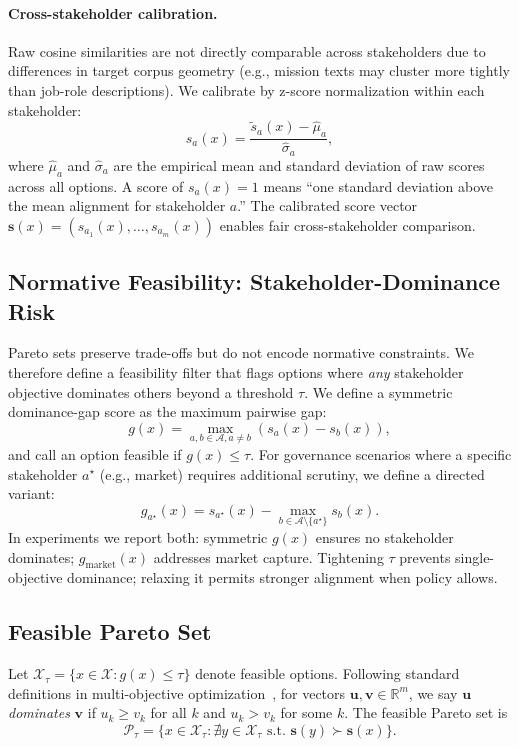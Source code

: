 \documentclass[sigconf,review]{acmart}
\begin{document}
\paragraph{Cross-stakeholder calibration.}
Raw cosine similarities are not directly comparable across stakeholders due to differences in target corpus geometry (e.g., mission texts may cluster more tightly than job-role descriptions). We calibrate by z-score normalization within each stakeholder:
\begin{equation}
  s_a(x) = \frac{\tilde{s}_a(x) - \hat{\mu}_a}{\hat{\sigma}_a},
\end{equation}
where $\hat{\mu}_a$ and $\hat{\sigma}_a$ are the empirical mean and standard deviation of raw scores across all options. A score of $s_a(x) = 1$ means ``one standard deviation above the mean alignment for stakeholder $a$.''
The calibrated score vector $\mathbf{s}(x) = (s_{a_1}(x),\dots,s_{a_m}(x))$ enables fair cross-stakeholder comparison.

\subsection{Normative Feasibility: Stakeholder-Dominance Risk}
\label{subsec:constraint}
Pareto sets preserve trade-offs but do not encode normative constraints. We therefore define a feasibility filter that flags options where \emph{any} stakeholder objective dominates others beyond a threshold $\tau$.
We define a symmetric dominance-gap score as the maximum pairwise gap:
\begin{equation}
  g(x) = \max_{a,b \in \mathcal{A}, a \neq b} \left( s_a(x) - s_b(x) \right),
\end{equation}
and call an option feasible if $g(x) \le \tau$. For governance scenarios where a specific stakeholder $a^\star$ (e.g., market) requires additional scrutiny, we define a directed variant:
\begin{equation}
  g_{a^\star}(x) = s_{a^\star}(x) - \max_{b\in\mathcal{A}\setminus\{a^\star\}} s_b(x).
\end{equation}
In experiments we report both: symmetric $g(x)$ ensures no stakeholder dominates; $g_{\text{market}}(x)$ addresses market capture. Tightening $\tau$ prevents single-objective dominance; relaxing it permits stronger alignment when policy allows.

\subsection{Feasible Pareto Set}
Let $\mathcal{X}_\tau=\{x\in\mathcal{X}: g(x)\le\tau\}$ denote feasible options. Following standard definitions in multi-objective optimization~\cite{deb2002nsga2}, for vectors $\mathbf{u},\mathbf{v}\in\mathbb{R}^m$, we say $\mathbf{u}$ \emph{dominates} $\mathbf{v}$ if $u_k\ge v_k$ for all $k$ and $u_k>v_k$ for some $k$. The feasible Pareto set is
\begin{equation}
  \mathcal{P}_\tau = \big\{x\in\mathcal{X}_\tau : \nexists y\in\mathcal{X}_\tau \text{ s.t. } \mathbf{s}(y)\succ \mathbf{s}(x)\big\}.
\end{equation}
\end{document}
